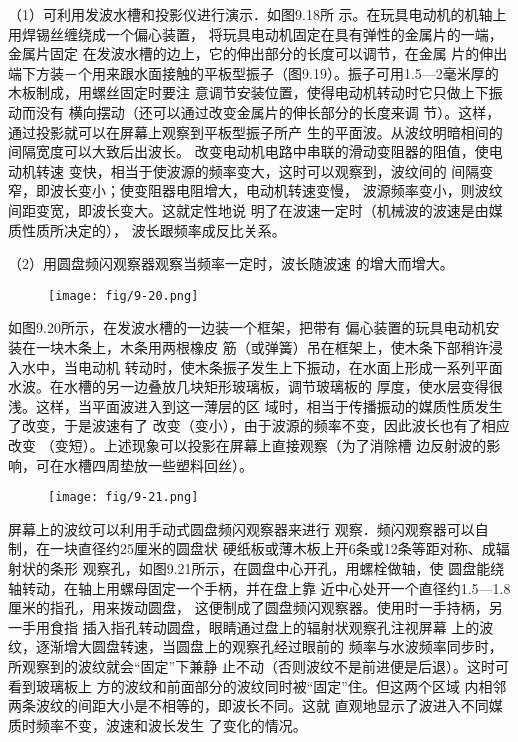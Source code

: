 （1）可利用发波水槽和投影仪进行演示．如图9.18所
示。在玩具电动机的机轴上用焊锡丝缠绕成一个偏心装置，
将玩具电动机固定在具有弹性的金属片的一端，金属片固定
在发波水槽的边上，它的伸出部分的长度可以调节，在金属
片的伸出端下方装－个用来跟水面接触的平板型振子（图9.19）。振子可用1.5—2毫米厚的木板制成，用螺丝固定时要注
意调节安装位置，使得电动机转动时它只做上下振动而没有
横向摆动（还可以通过改变金属片的伸长部分的长度来调
节）。这样，通过投影就可以在屏幕上观察到平板型振子所产
生的平面波。从波纹明暗相间的间隔宽度可以大致后出波长。
改变电动机电路中串联的滑动变阻器的阻值，使电动机转速
变快，相当于使波源的频率变大，这时可以观察到，波纹间的
间隔变窄，即波长变小；使变阻器电阻增大，电动机转速变慢，
波源频率变小，则波纹间距变宽，即波长变大。这就定性地说
明了在波速一定时（机械波的波速是由媒质性质所决定的），
波长跟频率成反比关系。

（2）用圆盘频闪观察器观察当频率一定时，波长随波速
的增大而增大。
\begin{figure}[htp]
    \centering
    \texttt{[image: fig/9-20.png]}
    \caption{}
\end{figure}

如图9.20所示，在发波水槽的一边装一个框架，把带有
偏心装置的玩具电动机安装在一块木条上，木条用两根橡皮
筋（或弹簧）吊在框架上，使木条下部稍许浸入水中，当电动机
转动时，使木条振子发生上下振动，在水面上形成一系列平面
水波。在水槽的另一边叠放几块矩形玻璃板，调节玻璃板的
厚度，使水层变得很浅。这样，当平面波进入到这一薄层的区
域时，相当于传播振动的媒质性质发生了改变，于是波速有了
改变（变小），由于波源的频率不变，因此波长也有了相应改变
（变短）。上述现象可以投影在屏幕上直接观察（为了消除槽
边反射波的影响，可在水槽四周垫放一些塑料回丝）。

\begin{figure}[htp]
    \centering
    \texttt{[image: fig/9-21.png]}
    \caption{}
\end{figure}

屏幕上的波纹可以利用手动式圆盘频闪观察器来进行
观察．频闪观察器可以自制，在一块直径约25厘米的圆盘状
硬纸板或薄木板上开6条或12条等距对称、成辐射状的条形
观察孔，如图9.21所示，在圆盘中心开孔，用螺栓做轴，使
圆盘能绕轴转动，在轴上用螺母固定一个手柄，并在盘上靠
近中心处开一个直径约1.5—1.8厘米的指孔，用来拨动圆盘，
这便制成了圆盘频闪观察器。使用时一手持柄，另一手用食指
插入指孔转动圆盘，眼睛通过盘上的辐射状观察孔注视屏幕
上的波纹，逐渐增大圆盘转速，当圆盘上的观察孔经过眼前的
频率与水波频率同步时，所观察到的波纹就会“固定”下兼静
止不动（否则波纹不是前进便是后退）。这时可看到玻璃板上
方的波纹和前面部分的波纹同时被“固定”住。但这两个区域
内相邻两条波纹的间距大小是不相等的，即波长不同。这就
直观地显示了波进入不同媒质时频率不变，波速和波长发生
了变化的情况。

